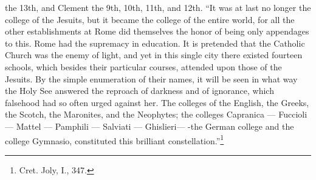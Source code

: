 \documentclass[]{book}
\let\rmarkdownfootnote\footnote%
\def\footnote{\protect\rmarkdownfootnote}
\begin{document}
the 13th, and Clement the 9th, 10th, 11th, and 12th. ``It was at last no longer the college of the Jesuits, but it became the college of the entire world, for all the other establishments at Rome did themselves the honor of being only appendages to this. Rome had the supremacy in education. It is pretended that the Catholic Church was the enemy of light, and yet in this single city there existed fourteen schools, which besides their particular courses, attended upon those of the Jesuits. By the simple enumeration of their names, it will be seen in what way the Holy See answered the reproach of darkness and of ignorance, which falsehood had so often urged against her. The colleges of the English, the Greeks, the Scotch, the Maronites, and the Neophytes; the colleges Capranica --- Fuccioli --- Mattel --- Pamphili --- Salviati --- Ghislieri--- -the German college and the college Gymnasio, constituted this brilliant constellation.''\footnote{Cret. Joly, I., 347.}
\end{document}
